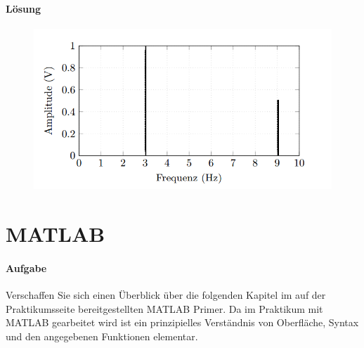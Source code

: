 \documentclass[10pt]{scrreprt}
\begin{document}
        \paragraph{Lösung}
        \begin{center}
            \begin{figure}[H]
                \includegraphics[width=\textwidth]{vorbereitenderBulldshit2.png}
            \end{figure}
        \end{center}

        \section{MATLAB}
        \paragraph{Aufgabe}
        Verschaffen Sie sich einen Überblick über die folgenden Kapitel im auf der Praktikumsseite
        bereitgestellten MATLAB Primer. Da im Praktikum mit MATLAB gearbeitet wird ist
        ein prinzipielles Verständnis von Oberfläche, Syntax und den angegebenen Funktionen
        elementar.
\end{document}
